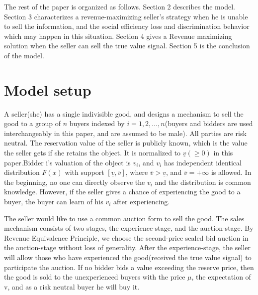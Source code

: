 \documentclass[review]{elsarticle}
\begin{document}
The rest of the paper is organized as follows. Section 2 describes
the model. Section 3 characterizes a revenue-maximizing seller's
strategy when he is unable to sell the information, and the social efficiency
loss and discrimination behavior which may happen in this
situation. Section 4 gives a Revenue maximizing solution when the seller can sell the true value signal. Section 5 is the conclusion of the model.

\section{Model setup}

A seller(she) has a single indivisible good, and
designs a mechanism to sell the good to a group of $n$ buyers indexed by $i=1,2,...,n$(buyers and
bidders are used interchangeably in this paper, and are assumed to be
male). All parties are risk neutral.
 The reservation value of the seller
is publicly known, which is the value the seller gets
if she retains the object. It is normalized to $\underline{v}(\geq 0)$ in this paper.Bidder i's valuation of the object
is $v_{i}$, and $v_{i}$ has independent identical distribution $F(x)$ with support $[\underline{v},\overline{v}]$,
where $\overline{v}>\underline{v}$, and $\overline{v}=+\infty$ is allowed. 
In the beginning, no one can directly observe the $v_{i}$ and the distribution is common knowledge. However, if the seller gives a chance of experiencing the good to a buyer, the buyer can learn of his $v_{i}$ after experiencing.
 

The seller would like to use a common auction form to sell the
good.  The sales mechanism consists of two stages, the experience-stage, and the auction-stage. By  Revenue Equivalence Principle, we choose the second-price
sealed bid auction in the auction-stage without loss of generality.
After the  experience-stage, the seller will allow those who
have experienced the good(received the true value signal) to
participate the auction. If no bidder bids a value exceeding the
reserve price, then the good is sold to the unexperienced buyers with the
price $\mu$, the expectation of v, and as a risk neutral buyer he will buy it.
\end{document}
